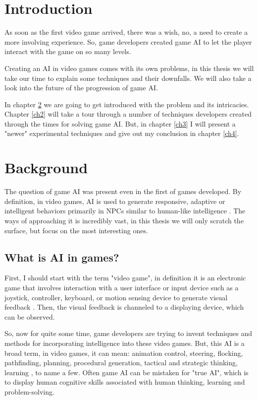 \documentclass[a4paper, 12pt]{book}
\begin{document}

\mainmatter
\setcounter{page}{1}
\pagestyle{fancy}


\chapter{Introduction}

As soon as the first video game arrived, there was a wish, no, a need to create a more involving experience. So, game developers created game AI to let the player interact with the game on so many levels.

Creating an AI in video games comes with its own problems, in this thesis we will take our time to explain some techniques and their downfalls. We will also take a look into the future of the progression of game AI.


In chapter \ref{ch1} we are going to get introduced with the problem and its intricacies. Chapter \ref{ch2} will take a tour through a number of techniques developers created through the times for solving game AI. But, in chapter \ref{ch3} I will present a "newer" experimental techniques and give out my conclusion in chapter \ref{ch4}.


\chapter{Background}
\label{ch1}
The question of game AI was present even in the first of games developed. By definition, in video games, AI is used to generate responsive, adaptive or intelligent behaviors primarily in NPCs similar to human-like intelligence \cite{AIwiki}. The ways of approaching it is incredibly vast, in this thesis we will only scratch the surface, but focus on the most interesting ones.

\section{What is AI in games?}
First, I should start with the term "video game", in definition it is an electronic game that involves interaction with a user interface or input device such as a joystick, controller, keyboard, or motion sensing device to generate visual feedback \cite{VideoGameWiki}. Then, the visual feedback is channeled to a displaying device, which can be observed. 

So, now for quite some time, game developers are trying to invent techniques and methods for incorporating intelligence into these video games. But, this AI is a broad term, in video games, it can mean: animation control, steering, flocking, pathfinding, planning, procedural generation, tactical and strategic thinking, learning \cite{FuzzyAIGames}, to name a few. Often game AI can be mistaken for "true AI", which is to display human cognitive skills associated with human thinking, learning and problem-solving.
\end{document}
